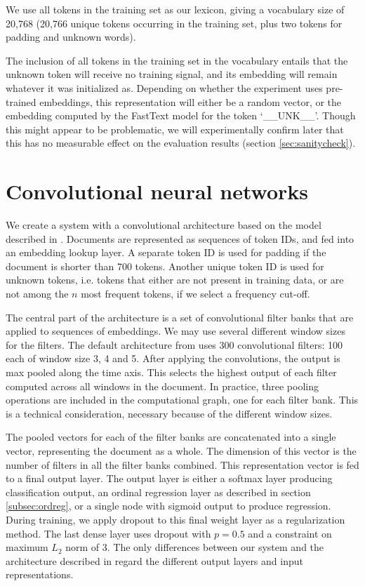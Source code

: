 We use all tokens in the training set as our lexicon, giving a vocabulary
size of 20,768 (20,766 unique tokens occurring in the training set, plus two
tokens for padding and unknown words).

The inclusion of all tokens in the training set in the vocabulary entails
that the unknown token will receive no training signal, and its embedding
will remain whatever it was initialized as. Depending on whether the
experiment uses pre-trained embeddings, this representation will either be a
random vector, or the embedding computed by the FastText model for the token
`\_\_UNK\_\_'. Though this might appear to be problematic, we will
experimentally confirm later that this has no measurable effect on the
evaluation results (section \ref{sec:sanitycheck}).


\section{Convolutional neural networks}

We create a system with a convolutional architecture based on the model
described in \textcite{kim2014convolutional}. Documents are represented as
sequences of token IDs, and fed into an embedding lookup layer. A separate
token ID is used for padding if the document is shorter than 700 tokens.
Another unique token ID is used for unknown tokens, i.e. tokens that either
are not present in training data, or are not among the $n$ most frequent
tokens, if we select a frequency cut-off.

The central part of the architecture is a set of convolutional filter banks
that are applied to sequences of embeddings. We may use several different
window sizes for the filters. The default architecture from
\textcite{kim2014convolutional} uses 300 convolutional filters: 100 each of
window size 3, 4 and 5. After applying the convolutions, the output is max
pooled along the time axis. This selects the highest output of each filter
computed across all windows in the document. In practice, three pooling
operations are included in the computational graph, one for each filter bank.
This is a technical consideration, necessary because of the different window
sizes.

The pooled vectors for each of the filter banks are concatenated into a
single vector, representing the document as a whole. The dimension of this
vector is the number of filters in all the filter banks combined. This
representation vector is fed to a final output layer. The output layer is
either a softmax layer producing classification output, an ordinal regression
layer as described in section \ref{subsec:ordreg}, or a single node with
sigmoid output to produce regression. During training, we apply dropout to
this final weight layer as a regularization method. The last dense layer uses
dropout with $p=0.5$ and a constraint on maximum $L_2$ norm of 3. The only
differences between our system and the architecture described in
\textcite{kim2014convolutional} regard the different output layers and input
representations.


